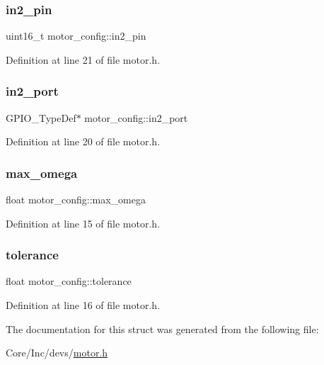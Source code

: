 \subsubsection{\texorpdfstring{in2\_pin}{in2\_pin}}
{\footnotesize\ttfamily uint16\+\_\+t motor\+\_\+config\+::in2\+\_\+pin}



Definition at line 21 of file motor.\+h.

\mbox{\label{structmotor__config_a4b46a55de08e33e2e7a7f255568dfd7b}} 
\subsubsection{\texorpdfstring{in2\_port}{in2\_port}}
{\footnotesize\ttfamily G\+P\+I\+O\+\_\+\+Type\+Def$\ast$ motor\+\_\+config\+::in2\+\_\+port}



Definition at line 20 of file motor.\+h.

\mbox{\label{structmotor__config_a88fc8ca47e3b231b22a03499cf7dc1c5}} 
\subsubsection{\texorpdfstring{max\_omega}{max\_omega}}
{\footnotesize\ttfamily float motor\+\_\+config\+::max\+\_\+omega}



Definition at line 15 of file motor.\+h.

\mbox{\label{structmotor__config_a65896f970ca53f058d57ec2fc5188719}} 
\subsubsection{\texorpdfstring{tolerance}{tolerance}}
{\footnotesize\ttfamily float motor\+\_\+config\+::tolerance}



Definition at line 16 of file motor.\+h.



The documentation for this struct was generated from the following file\+:\begin{DoxyCompactItemize}
\item 
Core/\+Inc/devs/\mbox{\hyperlink{motor_8h}{motor.\+h}}\end{DoxyCompactItemize}
